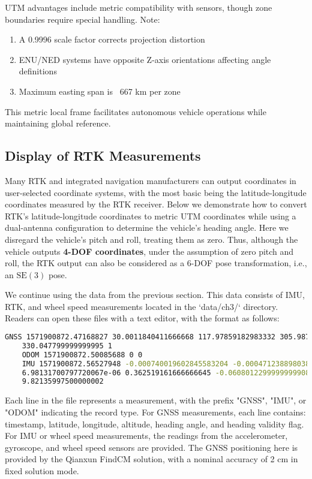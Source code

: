 UTM advantages include metric compatibility with sensors, though zone boundaries require special handling. Note:
\begin{enumerate}
	\item A 0.9996 scale factor corrects projection distortion
	\item ENU/NED systems have opposite Z-axis orientations affecting angle definitions
	\item Maximum easting span is ~667 km per zone
\end{enumerate}

This metric local frame facilitates autonomous vehicle operations while maintaining global reference.

\subsection{Display of RTK Measurements}
Many RTK and integrated navigation manufacturers can output coordinates in user-selected coordinate systems, with the most basic being the latitude-longitude coordinates measured by the RTK receiver. Below we demonstrate how to convert RTK's latitude-longitude coordinates to metric UTM coordinates while using a dual-antenna configuration to determine the vehicle's heading angle. Here we disregard the vehicle's pitch and roll, treating them as zero. Thus, although the vehicle outputs \textbf{4-DOF coordinates}, under the assumption of zero pitch and roll, the RTK output can also be considered as a 6-DOF pose transformation, i.e., an $\mathrm{SE}(3)$ pose.

We continue using the data from the previous section. This data consists of IMU, RTK, and wheel speed measurements located in the `data/ch3/` directory. Readers can open these files with a text editor, with the format as follows:

\begin{lstlisting}[language=sh, caption=Example data file]
	GNSS 1571900872.47168827 30.0011840411666668 117.97859182983332 305.98748779296875 
	330.047799999999995 1
	ODOM 1571900872.50085688 0 0
	IMU 1571900872.56527948 -0.000740019602845583204 -0.000471238898038460995 
	6.98131700797720067e-06 0.362519161666666645 -0.0608012299999999908 
	9.82135997500000002
\end{lstlisting}

Each line in the file represents a measurement, with the prefix "GNSS", "IMU", or "ODOM" indicating the record type. For GNSS measurements, each line contains: timestamp, latitude, longitude, altitude, heading angle, and heading validity flag. For IMU or wheel speed measurements, the readings from the accelerometer, gyroscope, and wheel speed sensors are provided. The GNSS positioning here is provided by the Qianxun FindCM solution, with a nominal accuracy of 2 cm in fixed solution mode.

